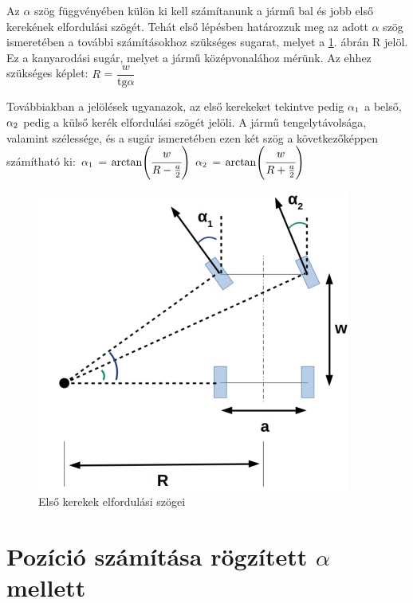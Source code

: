 \documentclass[a4paper]{paper}
\begin{document}
Az $\alpha$ szög függvényében külön ki kell számítanunk a jármű bal és jobb első kerekének elfordulási szögét.
Tehát első lépésben határozzuk meg az adott $\alpha$ szög ismeretében a további számításokhoz szükséges sugarat,
melyet a \ref{fig:turning_vehicle}. ábrán R jelöl. Ez a kanyarodási sugár, melyet a jármű középvonalához mérünk. Az ehhez szükséges képlet:\vspace{2mm}
$R$ = $\dfrac{w}{\text{tg} \alpha}$ \vspace{5mm}

Továbbiakban a jelölések ugyanazok, az első kerekeket tekintve pedig $\alpha\textsubscript{1}$ a belső, $\alpha\textsubscript{2}$ pedig a külső kerék elfordulási szögét jelöli. 
A jármű tengelytávolsága, valamint szélessége, és a sugár ismeretében ezen két szög a következőképpen számítható ki:\newline\
$\alpha\textsubscript{1}$ = $\text{arctan}\Bigg(\cfrac{w}{R-\frac{a}{2}}\Bigg)$ \hspace{1cm} $\alpha\textsubscript{2}$ = $\text{arctan}\Bigg(\cfrac{w}{R+\frac{a}{2}}\Bigg)$


\begin{figure}[h!]
\centering
\includegraphics[scale=0.5]{images/turning_vehicle.png}
\caption{Első kerekek elfordulási szögei}
\label{fig:turning_vehicle}
\end{figure}



\section{Pozíció számítása rögzített $\alpha$ mellett}
\end{document}
